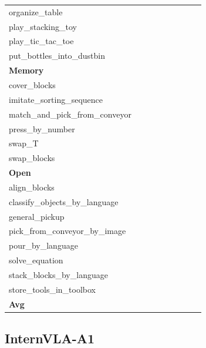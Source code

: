 \begin{table}[H]
{\begin{tabular}{l|c|c|c|c|c|c|c|c}
organize\_table &  &  &  &  &  &  &  &  \\
play\_stacking\_toy &  &  &  &  &  &  &  &  \\
play\_tic\_tac\_toe &  &  &  &  &  &  &  &  \\
put\_bottles\_into\_dustbin &  &  &  &  &  &  &  &  \\
\hline
\multicolumn{9}{l}{\textbf{Memory}} \\
cover\_blocks &  &  &  &  &  &  &  &  \\
imitate\_sorting\_sequence &  &  &  &  &  &  &  &  \\
match\_and\_pick\_from\_conveyor &  &  &  &  &  &  &  &  \\
press\_by\_number &  &  &  &  &  &  &  &  \\
swap\_T &  &  &  &  &  &  &  &  \\
swap\_blocks &  &  &  &  &  &  &  &  \\
\hline
\multicolumn{9}{l}{\textbf{Open}} \\
align\_blocks &  &  &  &  &  &  &  &  \\
classify\_objects\_by\_language &  &  &  &  &  &  &  &  \\
general\_pickup &  &  &  &  &  &  &  &  \\
pick\_from\_conveyor\_by\_image &  &  &  &  &  &  &  &  \\
pour\_by\_language &  &  &  &  &  &  &  &  \\
solve\_equation &  &  &  &  &  &  &  &  \\
stack\_blocks\_by\_language &  &  &  &  &  &  &  &  \\
store\_tools\_in\_toolbox &  &  &  &  &  &  &  &  \\
\hline
\textbf{Avg} &  &  &  &  &  &  &  &  \\
\hline
\end{tabular}
}
\end{table}
\subsection{InternVLA-A1}
\label{part:internvla_a1}

